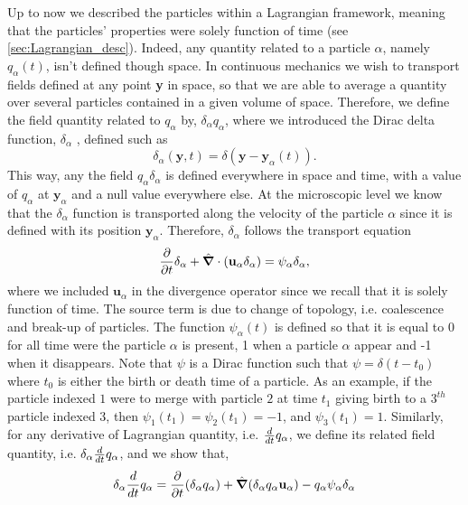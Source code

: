 Up to now we described the particles within a Lagrangian framework, meaning that the particles' properties were solely function of time (see \ref{sec:Lagrangian_desc}). 
Indeed, any quantity related to a particle $\alpha$, namely $q_\alpha(t)$, isn't defined though space. 
In continuous mechanics we wish to transport fields defined at any point \textbf{y} in space, so that we are able to average a quantity over several particles contained in a given volume of space.
Therefore, we define the field quantity related  to $q_\alpha$ by, $\delta_\alpha q_\alpha$, where we introduced the Dirac delta function, $\delta_\alpha$ \citep{morel2015mathematical}, defined such as
\begin{equation}
    \delta_\alpha(\textbf{y},t) = \delta(\textbf{y}-\textbf{y}_\alpha(t)).
\end{equation}
This way, any the field $q_\alpha \delta_\alpha$ is defined everywhere in space and time, with a value of $q_\alpha$ at $\textbf{y}_\alpha$ and a null value everywhere else. 
At the microscopic level we know that the $\delta_\alpha$ function is transported along the velocity of the particle $\alpha$ since it is defined with its position $\textbf{y}_\alpha$. 
Therefore, $\delta_\alpha$ follows the transport equation 
\begin{equation}
    \frac{\partial}{\partial t} \delta_\alpha 
    + \hat{\bm{\nabla}} \cdot (\textbf{u}_\alpha  \delta_\alpha) 
    = \psi_\alpha \delta_\alpha,
    \label{eq:delta_alpha_dt}
\end{equation}
where we included $\textbf{u}_\alpha$ in the divergence operator since we recall that it is solely function of time. 
The source term is due to change of topology, i.e. coalescence and break-up of particles.
The function $\psi_\alpha(t)$ is defined so that it is equal to 0 for all time were the particle $\alpha$ is present, 1 when a particle $\alpha$ appear and -1 when it disappears.
Note that $\psi$ is a Dirac function such that $\psi = \delta(t - t_0)$ where $t_0$ is either the birth or death time of a particle. 
As an example, if the particle indexed $1$ were to merge with particle $2$ at time $t_1$ giving birth to a $3^{th}$ particle indexed $3$, then $\psi_1(t_1) = \psi_2(t_1) = -1$, and $\psi_3(t_1) = 1$. 
Similarly, for any derivative of Lagrangian quantity, i.e. $\frac{d}{d t} q_\alpha$, we define its related field quantity, i.e. $\delta_\alpha \frac{d}{d t} q_\alpha$, and we show that, 
\begin{equation}
    \delta_\alpha \frac{d}{d t} q_\alpha
    = \frac{\partial}{\partial t} (\delta_\alpha q_\alpha)
    + \hat{\bm{\nabla}} (\delta_\alpha q_\alpha \textbf{u}_\alpha)
    - q_\alpha \psi_\alpha \delta_\alpha
    \label{eq:delta_q_alpha_dt}
\end{equation}
